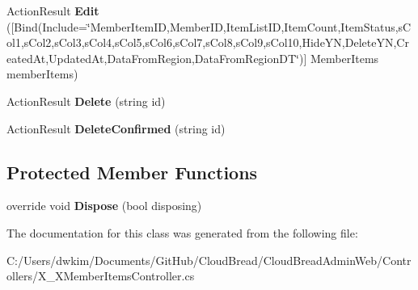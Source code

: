 \begin{DoxyCompactItemize}
\item 
Action\+Result {\bfseries Edit} (\mbox{[}Bind(Include=\char`\"{}Member\+Item\+ID,Member\+ID,Item\+List\+ID,Item\+Count,Item\+Status,s\+Col1,s\+Col2,s\+Col3,s\+Col4,s\+Col5,s\+Col6,s\+Col7,s\+Col8,s\+Col9,s\+Col10,Hide\+YN,Delete\+YN,Created\+At,Updated\+At,Data\+From\+Region,Data\+From\+Region\+DT\char`\"{})\mbox{]} Member\+Items member\+Items)\hypertarget{a00194_a8a4cc2e0c66aab962df56bc94bd6fd42}{}\label{a00194_a8a4cc2e0c66aab962df56bc94bd6fd42}

\item 
Action\+Result {\bfseries Delete} (string id)\hypertarget{a00194_a19374341124efc33cd01403e4c111e1c}{}\label{a00194_a19374341124efc33cd01403e4c111e1c}

\item 
Action\+Result {\bfseries Delete\+Confirmed} (string id)\hypertarget{a00194_af4a7288b7d8e78923ef7ac1a7f5ef0a8}{}\label{a00194_af4a7288b7d8e78923ef7ac1a7f5ef0a8}

\end{DoxyCompactItemize}
\subsection*{Protected Member Functions}
\begin{DoxyCompactItemize}
\item 
override void {\bfseries Dispose} (bool disposing)\hypertarget{a00194_a4073f601d8472a7cf91d18fafee1abb9}{}\label{a00194_a4073f601d8472a7cf91d18fafee1abb9}

\end{DoxyCompactItemize}


The documentation for this class was generated from the following file\+:\begin{DoxyCompactItemize}
\item 
C\+:/\+Users/dwkim/\+Documents/\+Git\+Hub/\+Cloud\+Bread/\+Cloud\+Bread\+Admin\+Web/\+Controllers/X\+\_\+\+X\+Member\+Items\+Controller.\+cs\end{DoxyCompactItemize}
